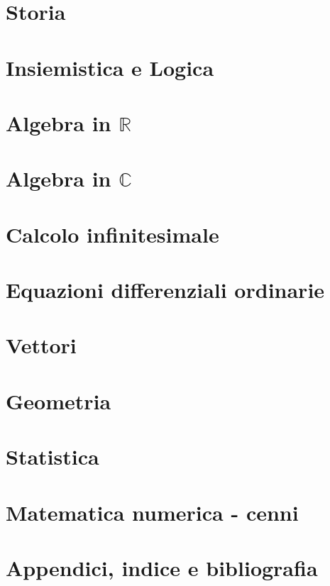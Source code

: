 
\part{Storia}


\part{Insiemistica e Logica}

\part{Algebra in $\mathbb{R}$}


\part{Algebra in $\mathbb{C}$}\label{book:complex_algebra}


\part{Calcolo infinitesimale}


\part{Equazioni differenziali ordinarie}


\part{Vettori}


\part{Geometria}


\part{Statistica}

\part{Matematica numerica - cenni}


\part{Appendici, indice e bibliografia}
